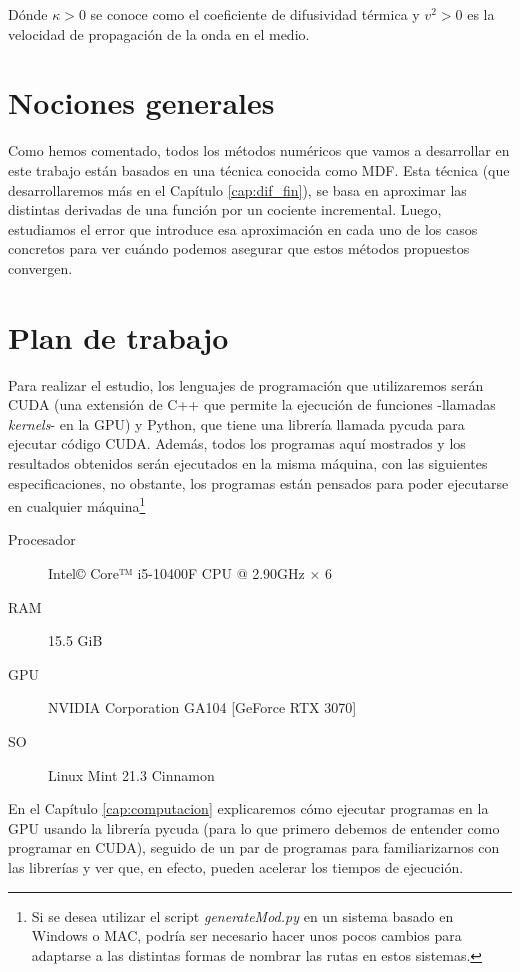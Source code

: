 Dónde $\kappa>0$ se conoce como el coeficiente de difusividad térmica y $v^2>0$ es la velocidad de propagación de la onda en el medio. 

\section{Nociones generales}
Como hemos comentado, todos los métodos numéricos que vamos a desarrollar en este trabajo están basados en una técnica conocida como \ac{MDF}. Esta técnica (que desarrollaremos más en el Capítulo \ref{cap:dif_fin}), se basa en aproximar las distintas derivadas de una función por un cociente incremental. Luego, estudiamos el error que introduce esa aproximación en cada uno de los casos concretos para ver cuándo podemos asegurar que estos métodos propuestos convergen.

\section{Plan de trabajo} \label{subsec:plan_trabajo}
Para realizar el estudio, los lenguajes de programación que utilizaremos serán \ac{CUDA} (una extensión de C++ que permite la ejecución de funciones -llamadas \emph{kernels}- en la \ac{GPU}) y Python, que tiene una librería llamada pycuda para ejecutar código \ac{CUDA}. Además, todos los programas aquí mostrados y los resultados obtenidos serán ejecutados en la misma máquina, con las siguientes especificaciones, no obstante, los programas están pensados para poder ejecutarse en cualquier máquina\footnote{Si se desea utilizar el script \textit{generateMod.py} en un sistema basado en Windows o MAC, podría ser necesario hacer unos pocos cambios para adaptarse a las distintas formas de nombrar las rutas en estos sistemas.}

\begin{description}
	\item[Procesador] Intel© Core™ i5-10400F \ac{CPU} @ 2.90GHz × 6
	\item[RAM] 15.5 GiB
	\item[\ac{GPU}] NVIDIA Corporation GA104 [GeForce RTX 3070]
	\item[SO] Linux Mint 21.3 Cinnamon
\end{description}

En el Capítulo \ref{cap:computacion} explicaremos cómo ejecutar programas en la \ac{GPU} usando la librería pycuda (para lo que primero debemos de entender como programar en \ac{CUDA}), seguido de un par de programas para familiarizarnos con las librerías y ver que, en efecto, pueden acelerar los tiempos de ejecución.


